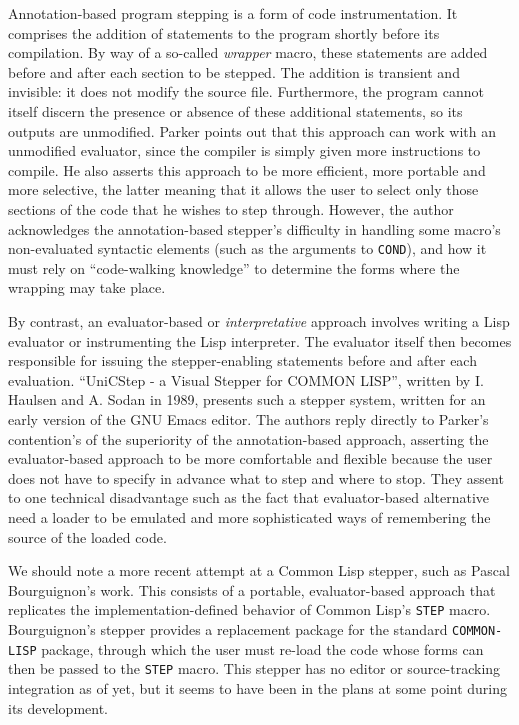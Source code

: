 \documentclass[format=sigconf]{acmart}
\begin{document}
Annotation-based program stepping is a form of code instrumentation.
It comprises the addition of statements to the program shortly before
its compilation.  By way of a so-called \emph{wrapper} macro, these
statements are added before and after each section to be stepped.  The
addition is transient and invisible: it does not modify the source
file.  Furthermore, the program cannot itself discern the presence or
absence of these additional statements, so its outputs are unmodified.
Parker\cite{annotation-based} points out that this approach can work
with an unmodified evaluator, since the compiler is simply given more
instructions to compile.  He also asserts this approach to be more
efficient, more portable and more selective, the latter meaning that
it allows the user to select only those sections of the code that he
wishes to step through.  However, the author acknowledges the
annotation-based stepper's difficulty in handling some macro's
non-evaluated syntactic elements (such as the arguments to
\texttt{COND}), and how it must rely on ``code-walking
knowledge''\cite[I-4.8]{annotation-based} to determine the forms where
the wrapping may take place.

By contrast, an evaluator-based or \emph{interpretative} approach
involves writing a Lisp evaluator or instrumenting the Lisp
interpreter. The evaluator itself then becomes responsible for issuing
the stepper-enabling statements before and after each evaluation.
``UniCStep - a Visual Stepper for COMMON LISP'', written by I. Haulsen
and A. Sodan in 1989\cite{evaluation-based}, presents such a stepper
system, written for an early version of the GNU Emacs editor. The
authors reply directly to Parker's contention's of the superiority of
the annotation-based approach, asserting the evaluator-based approach
to be more comfortable and flexible because the user does not have to
specify in advance what to step and where to stop.  They assent to one
technical disadvantage such as the fact that evaluator-based
alternative need a loader to be emulated and more sophisticated ways
of remembering the source of the loaded code.

We should note a more recent attempt at a Common Lisp stepper, such as
Pascal Bourguignon's work\cite{bourguignon}.  This consists of a
portable, evaluator-based approach that replicates the
implementation-defined behavior of Common Lisp's \texttt{STEP} macro.
Bourguignon's stepper provides a replacement package for the standard
\texttt{COMMON-LISP} package, through which the user must re-load the
code whose forms can then be passed to the \texttt{STEP} macro.  This
stepper has no editor or source-tracking integration as of yet, but it
seems to have been in the plans at some point during its development.
\end{document}
